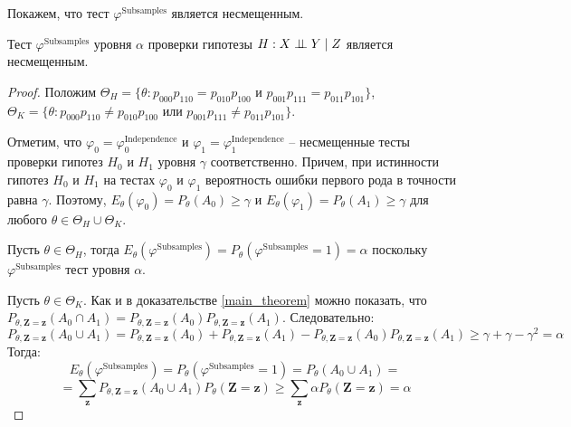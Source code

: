 Покажем, что тест $\varphi^{\text{Subsamples}}$ является несмещенным.
\begin{theorem}\label{unbias}
    Тест $\varphi^{\text{Subsamples}}$
    уровня $\alpha$
    проверки гипотезы 
    $H: X \perp\!\!\!\perp Y \mid Z$ является несмещенным.
\end{theorem}
\begin{proof}
    Положим $\Theta_{H}=\{\theta: p_{000}p_{110}=p_{010}p_{100}
    \text{ и } p_{001}p_{111}=p_{011}p_{101}\}$, 
    $\Theta_{K}=\{\theta: p_{000}p_{110}\neq p_{010}p_{100}
    \text{ или } p_{001}p_{111}\neq p_{011}p_{101}\}$.

    Отметим, что $\varphi_0 = \varphi^{\text{Independence}}_0$ и
    $\varphi_1 = \varphi^{\text{Independence}}_1$ -- несмещенные тесты
    проверки гипотез  $H_0$ и $H_1$ уровня $\gamma$
    соответственно. Причем, при истинности гипотез $H_0$
    и $H_1$ на тестах $\varphi_0$ и $\varphi_1$ вероятность ошибки
    первого рода в точности равна $\gamma$.
    Поэтому,
    $E_{\theta}(\varphi_0) = P_\theta(A_0)\geq \gamma$ и $E_{\theta}(\varphi_1) = P_\theta(A_1)\geq \gamma$ для любого
    $\theta \in \Theta_{H} \cup \Theta_{K}$.

    Пусть $\theta \in \Theta_{H}$, тогда
    $E_{\theta}(\varphi^{\text{Subsamples}}) =
    P_{\theta}(\varphi^{\text{Subsamples}}=1) = \alpha$ поскольку
    $\varphi^{\text{Subsamples}}$ тест уровня $\alpha$.

    Пусть $\theta \in \Theta_{K}$.
    Как и в доказательстве \autoref{main_theorem} можно показать, что
    $P_{\theta,\mathbf{Z}=\mathbf{z}}(A_0 \cap A_1)=
    P_{\theta,\mathbf{Z}=\mathbf{z}}(A_0)
    P_{\theta,\mathbf{Z}=\mathbf{z}}(A_1)$.
    Следовательно: 
    $$P_{\theta,\mathbf{Z}=\mathbf{z}}(A_0 \cup A_1) 
    = P_{\theta,\mathbf{Z}=\mathbf{z}}(A_0) +
    P_{\theta,\mathbf{Z}=\mathbf{z}}(A_1) - 
    P_{\theta,\mathbf{Z}=\mathbf{z}}(A_0)
    P_{\theta,\mathbf{Z}=\mathbf{z}}(A_1) 
    \geq \gamma + \gamma - \gamma^2 = \alpha
    $$
    Тогда:
    $$
    E_{\theta}(\varphi^{\text{Subsamples}}) =
    P_{\theta}(\varphi^{\text{Subsamples}}=1)=
    P_{\theta}(A_0 \cup A_1)=
    $$
    $$
    =\sum_{\mathbf{z}} P_{\theta,\mathbf{Z}=\mathbf{z}}(A_0 \cup A_1)P_{\theta}(\mathbf{Z}=\mathbf{z}) \geq
    \sum_{\mathbf{z}} \alpha P_{\theta}(\mathbf{Z}=\mathbf{z}) = \alpha
    $$
    
\end{proof}
